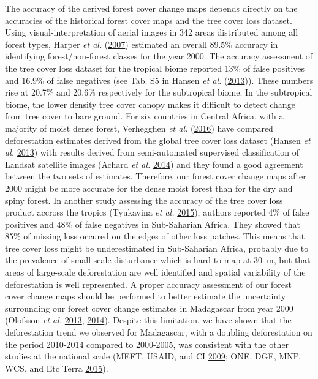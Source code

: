 \documentclass[]{article}
\theoremstyle{definition}
\theoremstyle{definition}
\theoremstyle{definition}
\theoremstyle{remark}
\begin{document}
The accuracy of the derived forest cover change maps depends directly on
the accuracies of the historical forest cover maps and the tree cover
loss dataset. Using visual-interpretation of aerial images in 342 areas
distributed among all forest types, Harper \emph{et al.}
(\protect\hyperlink{ref-Harper2007}{2007}) estimated an overall 89.5\%
accuracy in identifying forest/non-forest classes for the year 2000. The
accuracy assessment of the tree cover loss dataset for the tropical
biome reported 13\% of false positives and 16.9\% of false negatives
(see Tab. S5 in Hansen \emph{et al.}
(\protect\hyperlink{ref-Hansen2013}{2013})). These numbers rise at
20.7\% and 20.6\% respectively for the subtropical biome. In the
subtropical biome, the lower density tree cover canopy makes it
difficult to detect change from tree cover to bare ground. For six
countries in Central Africa, with a majority of moist dense forest,
Verhegghen \emph{et al.} (\protect\hyperlink{ref-Verhegghen2016}{2016})
have compared deforestation estimates derived from the global tree cover
loss dataset (Hansen \emph{et al.}
\protect\hyperlink{ref-Hansen2013}{2013}) with results derived from
semi-automated supervised classification of Landsat satellite images
(Achard \emph{et al.} \protect\hyperlink{ref-Achard2014}{2014}) and they
found a good agreement between the two sets of estimates. Therefore, our
forest cover change maps after 2000 might be more accurate for the dense
moist forest than for the dry and spiny forest. In another study
assessing the accuracy of the tree cover loss product accross the
tropics (Tyukavina \emph{et al.}
\protect\hyperlink{ref-Tyukavina2015}{2015}), authors reported 4\% of
false positives and 48\% of false negatives in Sub-Saharian Africa. They
showed that 85\% of missing loss occured on the edges of other loss
patches. This means that tree cover loss might be underestimated in
Sub-Saharian Africa, probably due to the prevalence of small-scale
disturbance which is hard to map at 30~m, but that areas of large-scale
deforestation are well identified and spatial variability of the
deforestation is well represented. A proper accuracy assessment of our
forest cover change maps should be performed to better estimate the
uncertainty surrounding our forest cover change estimates in Madagascar
from year 2000 (Olofsson \emph{et al.}
\protect\hyperlink{ref-Olofsson2013}{2013},
\protect\hyperlink{ref-Olofsson2014}{2014}). Despite this limitation, we
have shown that the deforestation trend we observed for Madagascar, with
a doubling deforestation on the period 2010-2014 compared to 2000-2005,
was consistent with the other studies at the national scale (MEFT,
USAID, and CI \protect\hyperlink{ref-MEFT2009}{2009}; ONE, DGF, MNP,
WCS, and Etc Terra \protect\hyperlink{ref-ONE2015}{2015}).
\end{document}
